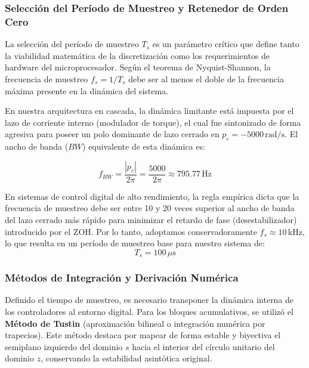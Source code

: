 \documentclass[10pt,a4paper]{article}
\begin{document}
\subsubsection{Selección del Período de Muestreo y Retenedor de Orden Cero}

La selección del período de muestreo $T_s$ es un parámetro crítico que define tanto la viabilidad matemática de la discretización como los requerimientos de hardware del microprocesador. Según el teorema de Nyquist-Shannon, la frecuencia de muestreo $f_s = 1/T_s$ debe ser al menos el doble de la frecuencia máxima presente en la dinámica del sistema.

En nuestra arquitectura en cascada, la dinámica limitante está impuesta por el lazo de corriente interno (modulador de torque), el cual fue sintonizado de forma agresiva para poseer un polo dominante de lazo cerrado en $p_c = -5000 \, \text{rad/s}$. El ancho de banda ($BW$) equivalente de esta dinámica es:

\begin{equation}
    f_{BW} = \frac{|p_c|}{2\pi} = \frac{5000}{2\pi} \approx 795.77 \, \text{Hz}
\end{equation}

En sistemas de control digital de alto rendimiento, la regla empírica dicta que la frecuencia de muestreo debe ser entre 10 y 20 veces superior al ancho de banda del lazo cerrado más rápido para minimizar el retardo de fase (desestabilizador) introducido por el ZOH. 
Por lo tanto, adoptamos conservadoramente $f_s \approx 10 \, \text{kHz}$, lo que resulta en un período de muestreo base para nuestro sistema de:
\begin{equation}
    T_s = 100 \, \mu\text{s}
\end{equation}

\subsubsection{Métodos de Integración y Derivación Numérica}

Definido el tiempo de muestreo, es necesario transponer la dinámica interna de los controladores al entorno digital. Para los bloques acumulativos, se utilizó el \textbf{Método de Tustin} (aproximación bilineal o integración numérica por trapecios). 
Este método destaca por mapear de forma estable y biyectiva el semiplano izquierdo del dominio $s$ hacia el interior del círculo unitario del dominio $z$, conservando la estabilidad asintótica original.
\end{document}
